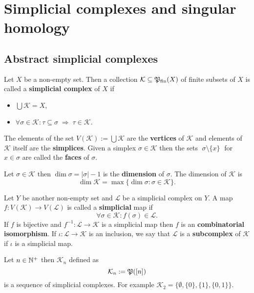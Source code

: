 \section{Simplicial complexes and singular homology}

\subsection{Abstract simplicial complexes}

\begin{defin}
    Let $X$ be a non-empty set. Then a collection $\mathcal{K} \subseteq \mathfrak{P}_{\text{fin}}(X)$ of finite subsets of $X$ is called a 
    \textbf{simplicial complex} of $X$ if
    \begin{itemize}
        \item $\bigcup \mathcal{K} = X$,
        \item $\forall \sigma\in\mathcal{K} \colon \tau \subseteq \sigma \; \Rightarrow \; \tau \in \mathcal{K}$.
    \end{itemize}
    The elements of the set $V(\mathcal{K}) := \bigcup \mathcal{K}$ are the \textbf{vertices} of $\mathcal{K}$ and
    elements of $\mathcal{K}$ itself are the \textbf{simplices}. Given a simplex $\sigma \in \mathcal{K}$ then the sets
    $\; \sigma \setminus \{x\} \;$ for $x \in \sigma$ are called the \textbf{faces} of $\sigma$.

    Let $\sigma \in \mathcal{K}$ then $\dim \sigma = |\sigma| -1$ is the \textbf{dimension} of $\sigma$. The dimension of $\mathcal{K}$ is
    \begin{equation*}
      \dim \mathcal{K} = \max\{\dim \sigma\colon \sigma \in \mathcal{K}\}.
    \end{equation*} 
    
    Let $Y$ be another non-empty set and $\mathcal{L}$ be a simplicial complex on $Y$. A map $f: V(\mathcal{K}) \to V(\mathcal{L})$ is called 
    a \textbf{simplicial} map if
    \begin{equation*}
        \forall \sigma \in \mathcal{K}\colon f(\sigma) \in \mathcal{L}.
    \end{equation*}
    If $f$ is bijective and $f^{-1}\colon \mathcal{L} \to \mathcal{K}$ is a simplicial map then $f$ is an \textbf{combinatorial isomorphism}.
    If $\iota\colon \mathcal{L} \to \mathcal{K}$ is an inclusion, we say that $\mathcal{L}$ is a \textbf{subcomplex} of $\mathcal{K}$ if $\iota$ is a simplicial map.
\end{defin}

\begin{ex}\label{ex:seqcom}
  Let $n \in \mathbb{N}^+$ then $\mathcal{K}_n$ defined as
  \begin{equation*}
    \mathcal{K}_n := \mathfrak{P}([n])
  \end{equation*}
  is a sequence of simplicial complexes. For example $\mathcal{K}_2 = \{\emptyset, \{0\}, \{1\}, \{0,1\}\}$.
\end{ex}

